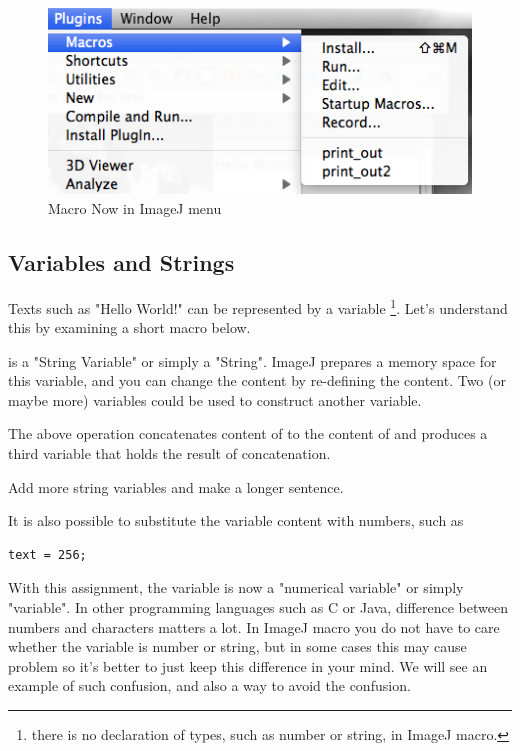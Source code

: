 \begin{indentexercise}{3}
\begin{figure}[htbp]
\begin{center}
\includegraphics[scale=0.6]{fig/firstMacroSetInMenu.png}
\caption{Macro Now in ImageJ menu} \label{fig_MacroInMenu}
\end{center}
\end{figure}
\end{indentexercise}

\subsection{Variables and Strings}
Texts such as "Hello World!" can be represented by a variable 
\footnote{there is no declaration of types, such as number or string, in ImageJ macro.}.
Let's understand this by examining a short macro below.


 is a "String Variable" or simply a "String". 
ImageJ prepares a memory space for this variable, and you can change the content by re-defining the content. Two (or maybe more) variables could be used to construct another variable. 



The above operation concatenates content of  to the content of  and produces a third variable  that holds the result of concatenation. 

\begin{indentexercise}{1}
\item Add more string variables and make a longer sentence.\\
\end{indentexercise}


It is also possible to substitute the variable content with numbers, such as\\
\begin{lstlisting}[numbers=none]
text = 256;
\end{lstlisting}
With this assignment, the variable is now a "numerical variable" or simply "variable". 
In other programming languages such as C or Java, difference between numbers and characters matters a lot. 
In ImageJ macro you do not have to care whether the variable is number or string,  but in some cases this may cause problem 
so it's better to just keep this difference in your mind. We will see an example of such confusion, 
and also a way to avoid the confusion. 


